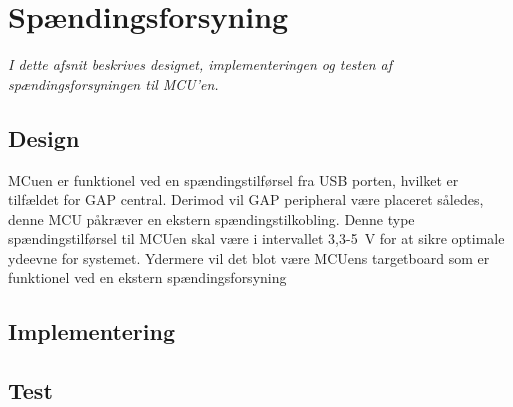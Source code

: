 \section{Spændingsforsyning}
\textit{I dette afsnit beskrives designet, implementeringen og testen af spændingsforsyningen til MCU'en.}

\subsection{Design}
MCuen er funktionel ved en spændingstilførsel fra USB porten, hvilket er tilfældet for GAP central. Derimod vil GAP peripheral være placeret således, denne MCU påkræver en ekstern spændingstilkobling. Denne type spændingstilførsel til MCUen skal være i intervallet 3,3-5~V for at sikre optimale ydeevne for systemet. Ydermere vil det blot være MCUens targetboard som er funktionel ved en ekstern spændingsforsyning \newline



\subsection{Implementering}
\subsection{Test}